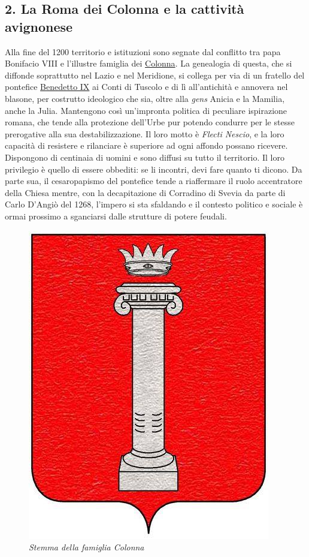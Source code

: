 \documentclass[
  letterpaper,
  DIV=11,
  numbers=noendperiod]{scrartcl}
\begin{document}
\subsection{2. La Roma dei Colonna e la cattività
avignonese}\label{la-roma-dei-colonna-e-la-cattivituxe0-avignonese}

Alla fine del 1200 territorio e istituzioni sono segnate dal conflitto
tra papa Bonifacio VIII e l'illustre famiglia dei
\href{2015-12-15-marcantonio-colonna-frascati-comandini.html}{Colonna}.
La genealogia di questa, che si diffonde soprattutto nel Lazio e nel
Meridione, si collega per via di un fratello del pontefice
\href{2013-04-02-benedetto-ix-tuscolo-comandini.html}{Benedetto IX} ai
Conti di Tuscolo e di lì all'antichità e annovera nel blasone, per
costrutto ideologico che sia, oltre alla \emph{gens} Anicia e la
Mamilia, anche la Julia. Mantengono così un'impronta politica di
peculiare ispirazione romana, che tende alla protezione dell'Urbe pur
potendo condurre per le stesse prerogative alla sua destabilizzazione.
Il loro motto è \emph{Flecti Nescio}, e la loro capacità di resistere e
rilanciare è superiore ad ogni affondo possano ricevere. Dispongono di
centinaia di uomini e sono diffusi su tutto il territorio. Il loro
privilegio è quello di essere obbediti: se li incontri, devi fare quanto
ti dicono. Da parte sua, il cesaropapismo del pontefice tende a
riaffermare il ruolo accentratore della Chiesa mentre, con la
decapitazione di Corradino di Svevia da parte di Carlo D'Angiò del 1268,
l'impero si sta sfaldando e il contesto politico e sociale è ormai
prossimo a sganciarsi dalle strutture di potere feudali.

\begin{figure}[H]

{\centering \includegraphics{../../images/2024/san_rocco/3Stemma_Colonna.jpg}

}

\caption{\emph{Stemma della famiglia Colonna}}

\end{figure}%
\end{document}
